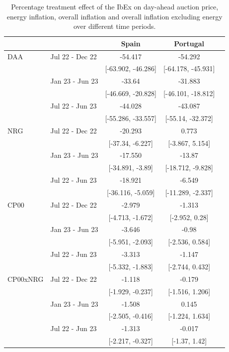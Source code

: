 \documentclass[12pt,a4paper]{article}
\begin{document}
\begin{table}[!t]
    \centering
    \setlength{\tabcolsep}{20pt}
    \renewcommand{\arraystretch}{1.35}
    \begin{tabular}{llccc}
        \toprule
        \toprule
        &  & Spain & Portugal \\
        \midrule
        DAA & Jul 22 - Dec 22  & -54.417 & -54.292 \\   
        &  & [-63.902, -46.286] & [-64.178, -45.931] \\
        & Jan 23 - Jun 23  & -33.64 & -31.883 \\       
        &  & [-46.669, -20.828] & [-46.101, -18.812] \\
        & Jul 22 - Jun 23  & -44.028 & -43.087 \\      
        &  & [-55.286, -33.557] & [-55.14, -32.372] \\
        \midrule
        NRG & Jul 22 - Dec 22  & -20.293 & 0.773 \\     
        &  & [-37.34, -6.227] & [-3.867, 5.154] \\     
        & Jan 23 - Jun 23  & -17.550 & -13.87 \\        
        &  & [-34.891, -3.89] & [-18.712, -9.828] \\   
        & Jul 22 - Jun 23  & -18.921 & -6.549 \\       
        &  & [-36.116, -5.059] & [-11.289, -2.337] \\ 
        \midrule
        CP00 & Jul 22 - Dec 22  & -2.979 & -1.313 \\    
        &  & [-4.713, -1.672] & [-2.952, 0.28] \\      
        & Jan 23 - Jun 23  & -3.646 & -0.98 \\         
        &  & [-5.951, -2.093] & [-2.536, 0.584] \\     
        & Jul 22 - Jun 23  & -3.313 & -1.147 \\        
        &  & [-5.332, -1.883] & [-2.744, 0.432] \\  
        \midrule
        CP00xNRG & Jul 22 - Dec 22  & -1.118 & -0.179 \\
        &  & [-1.929, -0.237] & [-1.516, 1.206] \\     
        & Jan 23 - Jun 23  & -1.508 & 0.145 \\         
        &  & [-2.505, -0.416] & [-1.224, 1.634] \\     
        & Jul 22 - Jun 23  & -1.313 & -0.017 \\        
        &  & [-2.217, -0.327] & [-1.37, 1.42] \\ 
        \bottomrule
        \bottomrule
    \end{tabular}
    \caption{Percentage treatment effect of the IbEx on day-ahead auction price, energy inflation, overall inflation and overall inflation excluding energy over different time periods.}
    \label{tab:ates}
\end{table}
\end{document}
